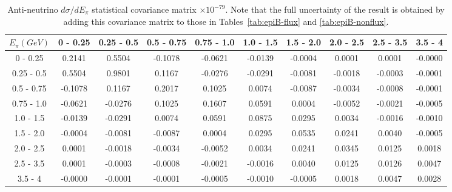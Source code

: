 \documentclass[aps,prl,twocolumn,showpacs,superscriptaddress,nofootinbib]{revtex4}
\begin{document}
\begingroup
\squeezetable
\begin{table}[h]
\tabcolsep=0.11cm
\begin{tabular}{c|ccccccccc}
$E_{\pi}(GeV)$ & 0 - 0.25 & 0.25 - 0.5 & 0.5 - 0.75 & 0.75 - 1.0 & 1.0 - 1.5 & 1.5 - 2.0 & 2.0 - 2.5 & 2.5 - 3.5 & 3.5 - 4 \\
\hline
0 - 0.25& 0.2141	&0.5504	&-0.1078	&-0.0621	&-0.0139	&-0.0004	&0.0001	&0.0001	&-0.0000	\\
0.25 - 0.5 &0.5504	&0.9801	&0.1167	&-0.0276	&-0.0291	&-0.0081	&-0.0018	&-0.0003&	-0.0001	\\
0.5 - 0.75 &-0.1078	&0.1167	&0.2017 &0.1025	&0.0074	&-0.0087	&-0.0034	&-0.0008	&-0.0001	\\
0.75 - 1.0 &-0.0621	&-0.0276	&0.1025	&0.1607	&0.0591	&0.0004	&-0.0052	&-0.0021	&-0.0005	\\
1.0 - 1.5 &-0.0139	&-0.0291	&0.0074	&0.0591	&0.0875	&0.0295	&0.0034	&-0.0016	&-0.0010	\\
1.5 - 2.0 &-0.0004	&-0.0081	&-0.0087	&0.0004	&0.0295	&0.0535	&0.0241	&0.0040	&-0.0005	\\
2.0 - 2.5 &0.0001	&-0.0018	&-0.0034	&-0.0052	&0.0034	&0.0241	&0.0345	&0.0125	&0.0018	\\
2.5 - 3.5 &0.0001	&-0.0003	&-0.0008	&-0.0021	&-0.0016	&0.0040	&0.0125	&0.0126	&0.0047	\\
3.5 - 4 &-0.0000	&-0.0001	&-0.0001	&-0.0005	&-0.0010	&-0.0005	&0.0018	&0.0047	&0.0028\\	
 
\end{tabular}
\caption{Anti-neutrino $d\sigma/dE_\pi$ statistical covariance matrix  $\times 10^{-79}$.  Note that the full uncertainty of the result is obtained by adding this covariance matrix to those in Tables~\ref{tab:epiB-flux} and \ref{tab:epiB-nonflux}. }
\end{table}
\endgroup
\end{document}
